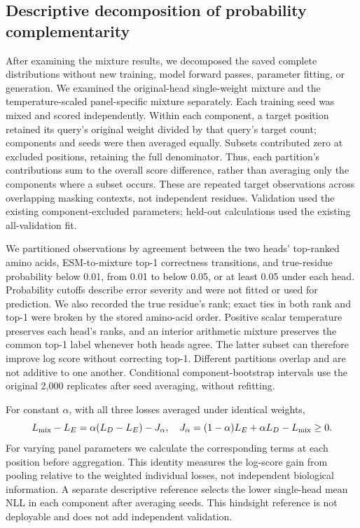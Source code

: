 \documentclass[referee,pdflatex,sn-vancouver-num]{sn-jnl}
\begin{document}
\subsection{Descriptive decomposition of probability complementarity}
After examining the mixture results, we decomposed the saved complete distributions without new training, model forward passes, parameter fitting, or generation. We examined the original-head single-weight mixture and the temperature-scaled panel-specific mixture separately. Each training seed was mixed and scored independently. Within each component, a target position retained its query's original weight divided by that query's target count; components and seeds were then averaged equally. Subsets contributed zero at excluded positions, retaining the full denominator. Thus, each partition's contributions sum to the overall score difference, rather than averaging only the components where a subset occurs. These are repeated target observations across overlapping masking contexts, not independent residues. Validation used the existing component-excluded parameters; held-out calculations used the existing all-validation fit.

We partitioned observations by agreement between the two heads' top-ranked amino acids, ESM-to-mixture top-1 correctness transitions, and true-residue probability below 0.01, from 0.01 to below 0.05, or at least 0.05 under each head. Probability cutoffs describe error severity and were not fitted or used for prediction. We also recorded the true residue's rank; exact ties in both rank and top-1 were broken by the stored amino-acid order. Positive scalar temperature preserves each head's ranks, and an interior arithmetic mixture preserves the common top-1 label whenever both heads agree. The latter subset can therefore improve log score without correcting top-1. Different partitions overlap and are not additive to one another. Conditional component-bootstrap intervals use the original 2,000 replicates after seed averaging, without refitting.

For constant $\alpha$, with all three losses averaged under identical weights,
\begin{equation}
 L_{\rm mix}-L_E=\alpha(L_D-L_E)-J_\alpha,\quad
 J_\alpha=(1-\alpha)L_E+\alpha L_D-L_{\rm mix}\geq0.
\label{eq:jensen}
\end{equation}
For varying panel parameters we calculate the corresponding terms at each position before aggregation. This identity measures the log-score gain from pooling relative to the weighted individual losses, not independent biological information. A separate descriptive reference selects the lower single-head mean NLL in each component after averaging seeds. This hindsight reference is not deployable and does not add independent validation.
\end{document}
